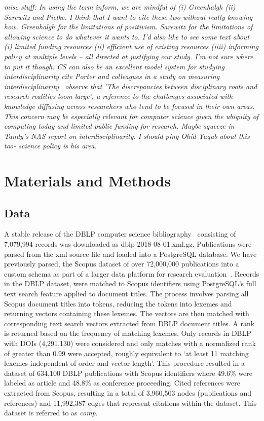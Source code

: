 \emph{misc stuff:  In using the term inform, we are mindful of (i) Greenhalgh (ii) Sarewitz and Pielke. I think that I want to cite these two without really knowing how. Greenhalgh for the limitations of positivism. Sarewitz for the limitations of allowing science to do whatever it wants to. I'd also like to see some text about (i) limited funding resources (ii) efficient use of existing resources (iiii) informing policy at multiple levels -- all directed at justifying our study. I'm not sure where to put it though. CS can also be an excellent model system for studying interdisciplinarity cite Porter and colleagues in a study on measuring interdisciplinarity~\cite{porter_measuring_2007} observe that 'The discrepancies between disciplinary roots and research realities loom large', a reference to the challenges associated with knowledge diffusing across researchers who tend to be focused in their own areas. This concern may be especially relevant for computer science given the ubiquity of computing today and limited public funding for research. Maybe squeeze in Tandy's NAS report on interdisciplinarity. I should ping Ohid Yaqub about this too- science policy is his area.}


\section{Materials and Methods}
\label{sec:methods}

\subsection{Data}
 A stable release of the DBLP computer science bibliography~\cite{dblp_ref} consisting of 7,079,994 records was downloaded as dblp-2018-08-01.xml.gz. Publications were parsed from the xml source file and loaded into a PostgreSQL database. We have previously parsed, the Scopus dataset of over 72,000,000 publications into a custom schema as part of a larger data platform for research evaluation~\cite{GithubERNIE2019}. Records in the DBLP dataset, were matched to Scopus identifiers using PostgreSQL's full text search feature applied to document titles. The process involves parsing all Scopus document titles into tokens, reducing the tokens into lexemes and returning vectors containing these lexemes. The vectors are then matched with corresponding text search vectors extracted from DBLP document titles. A rank is returned based on the frequency of matching lexemes. Only records in DBLP with DOIs (4,291,130) were considered and only matches with a normalized rank of greater than 0.99 were accepted, roughly equivalent to `at least 11 matching lexemes independent of order and vector length'. This procedure resulted in a dataset of 634,100 DBLP publications with Scopus identifiers where 49.6\% were labeled as article and 48.8\% as conference proceeding. Cited references were extracted from Scopus, resulting in a total of 3,960,503 nodes (publications and references) and 11,992,387 edges that represent citations within the dataset. This dataset is referred to as \emph{comp}.\par
 
